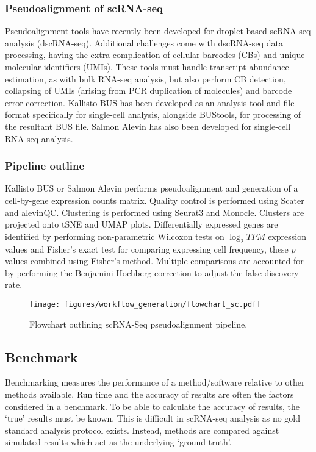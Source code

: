 \subsubsection{Pseudoalignment of scRNA-seq}
Pseudoalignment tools have recently been developed for droplet-based scRNA-seq analysis (dscRNA-seq).
Additional challenges come with dscRNA-seq data processing, having the extra complication of cellular barcodes (CBs) and unique molecular identifiers (UMIs).
These tools must handle transcript abundance estimation, as with bulk RNA-seq analysis, but also perform CB detection, collapsing of UMIs (arising from PCR duplication of molecules) and barcode error correction.
Kallisto BUS\cite{melsted2018barcode} has been developed as an analysis tool and file format specifically for single-cell analysis, alongside BUStools, for processing of the resultant BUS file\cite{melsted2019modular}.
Salmon Alevin\cite{srivastava2019alevin} has also been developed for single-cell RNA-seq analysis.

\subsubsection{Pipeline outline}
Kallisto BUS or Salmon Alevin performs pseudoalignment and generation of a cell-by-gene expression counts matrix.
Quality control is performed using Scater\cite{mccarthy2017scater} and alevinQC.
Clustering is performed using Seurat3\cite{stuart2019comprehensive} and Monocle\cite{trapnell2014dynamics}.
Clusters are projected onto tSNE and UMAP plots.
Differentially expressed genes are identified by performing non-parametric Wilcoxon tests on $\log_2 TPM$ expression values and Fisher's exact test for comparing expressing cell frequency, these $p$ values combined using Fisher's method.
Multiple comparisons are accounted for by performing the Benjamini-Hochberg correction to adjust the false discovery rate.

\begin{figure}[htbp]
\centering
\texttt{[image: figures/workflow\_generation/flowchart\_sc.pdf]}
\caption[scRNA-Seq pseudoalignment pipeline flowchart]{Flowchart outlining scRNA-Seq pseudoalignment pipeline.}
\label{fig:flowchart_scRNA}
\end{figure}

\subsection{Benchmark}\label{subsec:sc_bench}
Benchmarking measures the performance of a method/software relative to other methods available.
Run time and the accuracy of results are often the factors considered in a benchmark.
To be able to calculate the accuracy of results, the `true' results must be known.
This is difficult in scRNA-seq analysis as no gold standard analysis protocol exists.
Instead, methods are compared against simulated results which act as the underlying `ground truth'.

